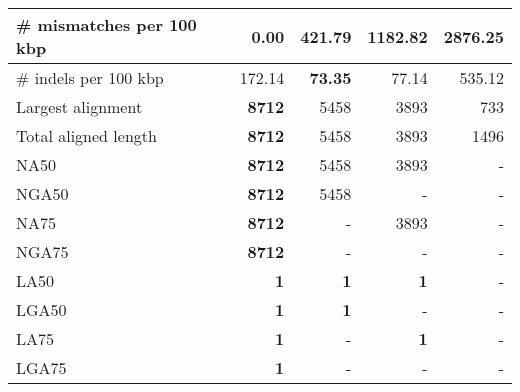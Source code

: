\documentclass[12pt,a4paper]{article}
\begin{document}
\begin{table}[ht]
\begin{center}
\begin{tabular}{|l*{4}{|r}|}
\# mismatches per 100 kbp & {\bf 0.00} & 421.79 & 1182.82 & 2876.25 \\ \hline
\# indels per 100 kbp & 172.14 & {\bf 73.35} & 77.14 & 535.12 \\ \hline
Largest alignment & {\bf 8712} & 5458 & 3893 & 733 \\ \hline
Total aligned length & {\bf 8712} & 5458 & 3893 & 1496 \\ \hline
NA50 & {\bf 8712} & 5458 & 3893 & - \\ \hline
NGA50 & {\bf 8712} & 5458 & - & - \\ \hline
NA75 & {\bf 8712} & - & 3893 & - \\ \hline
NGA75 & {\bf 8712} & - & - & - \\ \hline
LA50 & {\bf 1} & {\bf 1} & {\bf 1} & - \\ \hline
LGA50 & {\bf 1} & {\bf 1} & - & - \\ \hline
LA75 & {\bf 1} & - & {\bf 1} & - \\ \hline
LGA75 & {\bf 1} & - & - & - \\ \hline
\end{tabular}
\end{center}
\end{table}
\end{document}
